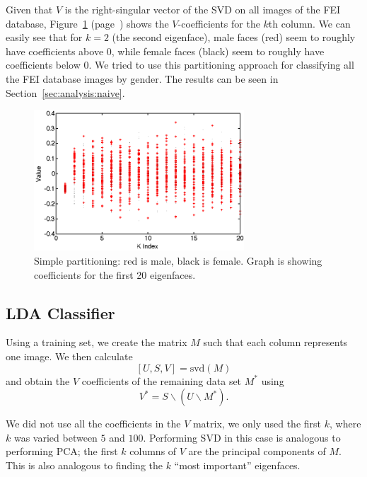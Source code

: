 \documentclass[hidelinks,11pt]{article}
\begin{document}

Given that $V$ is the right-singular vector of the SVD on all images of the FEI
database, Figure~\ref{fig:model:naive:part}
(page~\pageref{fig:model:naive:part}) shows the $V$-coefficients for the $k$th
column. We can easily see that for $k = 2$ (the second eigenface), male faces
(red) seem to roughly have coefficients above 0, while female faces (black) seem
to roughly have coefficients below 0. We tried to use this partitioning approach
for classifying all the FEI database images by gender. The results can be seen
in Section~\ref{sec:analysis:naive}.

\begin{figure}[!ht]
  \centering
  \includegraphics[width=0.7\textwidth]{naive_classifier_k_partition.png}
  \caption{Simple partitioning: red is male, black is female. Graph is showing
  coefficients for the first 20 eigenfaces.}
  \label{fig:model:naive:part}
\end{figure}

\pagebreak
\subsection{LDA Classifier} 
\label{sec:model:lda}

Using a training set, we create the matrix $M$ such that each column represents
one image. We then calculate
\[ \left[ U, S, V \right] = \mathrm{svd}(M) \]
and obtain the $V$ coefficients of the remaining data set $M^*$ using
\[ V^* = S \backslash (U \backslash M^*). \]

We did not use all the coefficients in the $V$ matrix, we only used the first
$k$, where $k$ was varied between $5$ and $100$. Performing SVD in this case is
analogous to performing PCA; the first $k$ columns of $V$ are the principal
components of $M$. This is also analogous to finding the $k$ ``most important''
eigenfaces.
\end{document}
